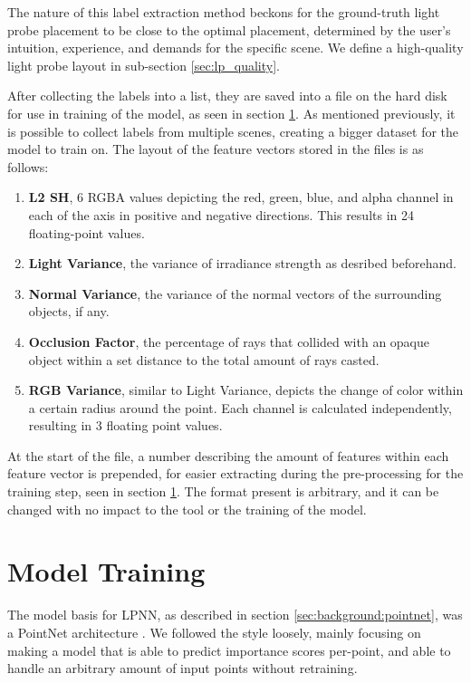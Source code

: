 The nature of this label extraction method beckons for the ground-truth light probe placement to be close to the optimal placement, determined by the user's intuition, experience, and demands for the specific scene. We define a high-quality light probe layout in sub-section \ref{sec:lp_quality}.

After collecting the labels into a list, they are saved into a file on the hard disk for use in training of the model, as seen in section \ref{sec:model_training}. As mentioned previously, it is possible to collect labels from multiple scenes, creating a bigger dataset for the model to train on. The layout of the feature vectors stored in the files is as follows:

\begin{enumerate}
	\item \textbf{L2 SH}, 6 RGBA values depicting the red, green, blue, and alpha channel in each of the axis in positive and negative directions. This results in 24 floating-point values.
	\item \textbf{Light Variance}, the variance of irradiance strength as desribed beforehand.
	\item \textbf{Normal Variance}, the variance of the normal vectors of the surrounding objects, if any.
	\item \textbf{Occlusion Factor}, the percentage of rays that collided with an opaque object within a set distance to the total amount of rays casted.
	\item \textbf{RGB Variance}, similar to Light Variance, depicts the change of color within a certain radius around the point. Each channel is calculated independently, resulting in 3 floating point values.
\end{enumerate}

At the start of the file, a number describing the amount of features within each feature vector is prepended, for easier extracting during the pre-processing for the training step, seen in section \ref{sec:model_training}. The format present is arbitrary, and it can be changed with no impact to the tool or the training of the model.

\section{Model Training}
\label{sec:model_training}

The model basis for LPNN, as described in section \ref{sec:background:pointnet}, was a PointNet architecture \parencite{PointNet2017}. We followed the style loosely, mainly focusing on making a model that is able to predict importance scores per-point, and able to handle an arbitrary amount of input points without retraining. 

